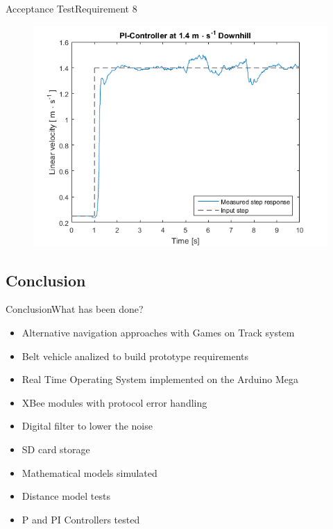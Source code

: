 \begin{frame}{Acceptance Test}{Requirement 8}
\begin{minipage}{\linewidth}
\begin{minipage}{0.45\linewidth}
\begin{figure}[H]
  			\includegraphics[scale=.38]{Pictures/AccTest8D.png}
  			\centering
  		\end{figure}
  	\end{minipage}
  \end{minipage}

\end{frame}




\subsection{Conclusion}

\begin{frame}{Conclusion}{What has been done?}

\pause

  \begin{itemize}
    \item<1-> Alternative navigation approaches with Games on Track system
    \item<2-> Belt vehicle analized to build prototype requirements
    \item<3-> Real Time Operating System implemented on the Arduino Mega
    \item<4-> XBee modules with protocol error handling
    \item<5-> Digital filter to lower the noise
    \item<6-> SD card storage
    \item<7-> Mathematical models simulated
    \item<8-> Distance model tests
    \item<9-> P and PI Controllers tested
  \end{itemize}
\end{frame}

